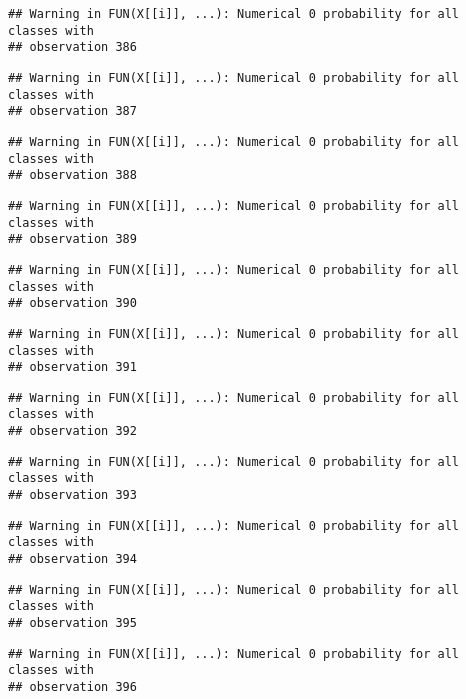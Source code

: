 \documentclass[
]{article}
\begin{document}
\begin{verbatim}
## Warning in FUN(X[[i]], ...): Numerical 0 probability for all classes with
## observation 386
\end{verbatim}

\begin{verbatim}
## Warning in FUN(X[[i]], ...): Numerical 0 probability for all classes with
## observation 387
\end{verbatim}

\begin{verbatim}
## Warning in FUN(X[[i]], ...): Numerical 0 probability for all classes with
## observation 388
\end{verbatim}

\begin{verbatim}
## Warning in FUN(X[[i]], ...): Numerical 0 probability for all classes with
## observation 389
\end{verbatim}

\begin{verbatim}
## Warning in FUN(X[[i]], ...): Numerical 0 probability for all classes with
## observation 390
\end{verbatim}

\begin{verbatim}
## Warning in FUN(X[[i]], ...): Numerical 0 probability for all classes with
## observation 391
\end{verbatim}

\begin{verbatim}
## Warning in FUN(X[[i]], ...): Numerical 0 probability for all classes with
## observation 392
\end{verbatim}

\begin{verbatim}
## Warning in FUN(X[[i]], ...): Numerical 0 probability for all classes with
## observation 393
\end{verbatim}

\begin{verbatim}
## Warning in FUN(X[[i]], ...): Numerical 0 probability for all classes with
## observation 394
\end{verbatim}

\begin{verbatim}
## Warning in FUN(X[[i]], ...): Numerical 0 probability for all classes with
## observation 395
\end{verbatim}

\begin{verbatim}
## Warning in FUN(X[[i]], ...): Numerical 0 probability for all classes with
## observation 396
\end{verbatim}
\end{document}
